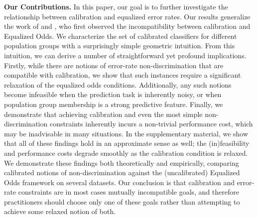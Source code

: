 \noindent\textbf{Our Contributions.}
In this paper, our goal is to further investigate the relationship
between calibration and equalized error rates.
Our results generalize the work of \citet{kleinberg2016inherent}
and \citet{chouldechova2017fair}, who first observed the incompatibility
between calibration and Equalized Odds.
We characterize the set of calibrated classifiers for different population
groups with a surprisingly simple geometric intuition.
From this intuition, we can derive a number of straightforward
yet profound implications.
%
Firstly, while there are notions of error-rate non-discrimination that are compatible
with calibration, we show that such instances require a significant
relaxation of the equalized odds conditions.
Additionally, any such notions become infeasible when the prediction task
is inherently noisy, or when population group membership is a strong predictive
feature.
Finally, we demonstrate that achieving calibration and even the most simple
non-discrimination constraints inherently incurs a non-trivial performance
cost, which may be inadvisable in many situations.
In the supplementary material, we show that all of these findings hold in
an approximate sense as well; the (in)feasibility and performance
costs degrade smoothly as the calibration condition is relaxed.
We demonstrate these findings both theoretically and empirically,
comparing calibrated notions of non-discrimination against
the (uncalibrated) Equalized Odds framework on several datasets.
Our conclusion is that calibration and error-rate constraints are in
most cases mutually incompatible goals, and therefore practitioners
should choose only one of these goals rather than attempting to achieve
some relaxed notion of both.





